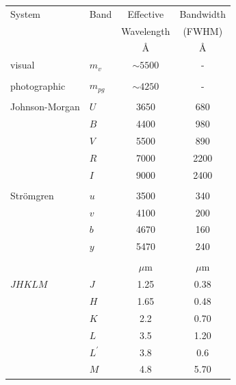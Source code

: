 \documentclass[twoside,11pt,nolof]{starlink}
\begin{document}
\begin{description}
\begin{table}[htbp]
  \begin{center}
  \begin{tabular}{llcc}
   System         & Band     & Effective  & Bandwidth \\
                  &          & Wavelength & (FWHM)    \\ \hline
                  &          & \AA        & \AA    \\
   visual         & $m_{v}$  & $\sim5500$ &  -     \\
                  &          &            &        \\
   photographic   & $m_{pg}$ & $\sim4250$ & -      \\
                  &          &            &        \\
   Johnson-Morgan & $U$      & 3650       & 680    \\
                  & $B$      & 4400       & 980    \\
                  & $V$      & 5500       & 890    \\
                  & $R$      & 7000       & 2200   \\
                  & $I$      & 9000       & 2400   \\
                  &          &            &        \\
   Str\"{o}mgren  & $u$      & 3500       & 340    \\
                  & $v$      & 4100       & 200    \\
                  & $b$      & 4670       & 160    \\
                  & $y$      & 5470       & 240    \\
                  &          &            &        \\
                  &              & $\mu$m & $\mu$m \\
   $JHKLM$        & $J$          & 1.25   & 0.38   \\
                  & $H$          & 1.65   & 0.48   \\
                  & $K$          & 2.2    & 0.70   \\
                  & $L$          & 3.5    & 1.20   \\
                  & $L^{\prime}$ & 3.8    & 0.6    \\
                  & $M$          & 4.8    & 5.70   \\
  \end{tabular}
  \end{center}


\end{table}
\end{description}
\end{document}
